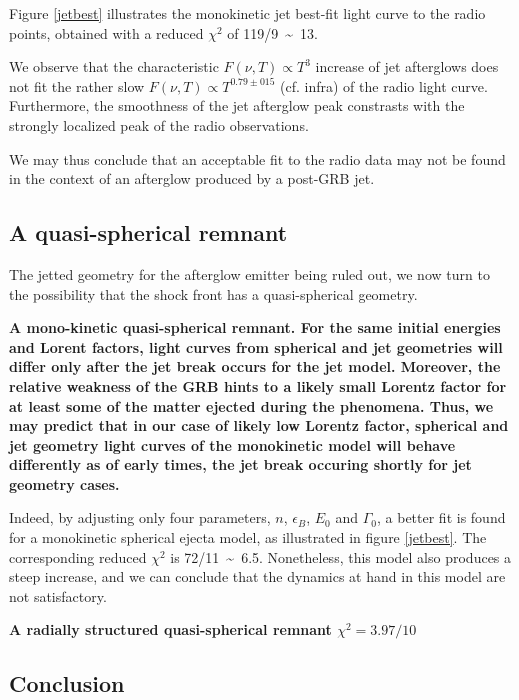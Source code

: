 
Figure \ref{jetbest} illustrates the monokinetic jet best-fit light curve to the radio points, obtained with a reduced $\chi^2$ of 119/9~\sim~13. 

We observe that the characteristic $F(\nu, T) \propto T^3$ increase of jet afterglows does not fit the rather slow $F(\nu, T) \propto T^{0.79\pm015}$ (cf. infra) of the radio light curve. Furthermore, the smoothness of the jet afterglow peak constrasts with the strongly localized peak of the radio observations.

We may thus conclude that an acceptable fit to the radio data may not be found in the context of an afterglow produced by a post-GRB jet.
\subsection{A quasi-spherical remnant}

The jetted geometry for the afterglow emitter being ruled out, we now turn to the possibility that the shock front has a quasi-spherical geometry.

\bf{A mono-kinetic quasi-spherical remnant. }For the same initial energies and Lorent factors, light curves from spherical and jet geometries will differ only after the jet break occurs for the jet model. Moreover, the relative weakness of the GRB hints to a likely small Lorentz factor for at least some of the matter ejected during the phenomena. Thus, we may predict that in our case of likely low Lorentz factor, spherical and jet geometry light curves of the monokinetic model will behave differently as of early times, the jet break occuring shortly for jet geometry cases.

Indeed, by adjusting only four parameters, $n$, $\epsilon_B$, $E_0$ and $\Gamma_0$, a better fit is found for a monokinetic spherical ejecta model, as illustrated in figure \ref{jetbest}. The corresponding reduced $\chi^2$ is 72/11~\sim~6.5. Nonetheless, this model also produces a steep increase, and we can conclude that the dynamics at hand in this model are not satisfactory.

\bf{A radially structured quasi-spherical remnant}
$\chi^2 = 3.97/10$
\subsection{Conclusion}

